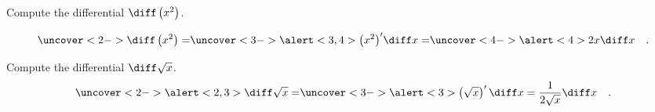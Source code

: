 \begin{frame}
\begin{example}
Compute the differential $\diff \left( x^2\right)$.

\[
\uncover<2->{\diff\left(x^2\right)=}\uncover<3->{ \alert<3,4>{\left(x^2\right)'} \diff x=} \uncover<4->{\alert<4>{2x} \diff x\quad .}
\]
\end{example}
\end{frame}
\begin{frame}
\begin{example}
Compute the differential $\diff  \sqrt{x}$.
\[
\uncover<2->{\alert<2,3>{\diff \sqrt{x}=}}\uncover<3->{\alert<3>{\left(\sqrt{x}\right)'\diff  x=  \frac{1}{2\sqrt{x}} \diff x }\quad .}
\]
\end{example}
\end{frame}

